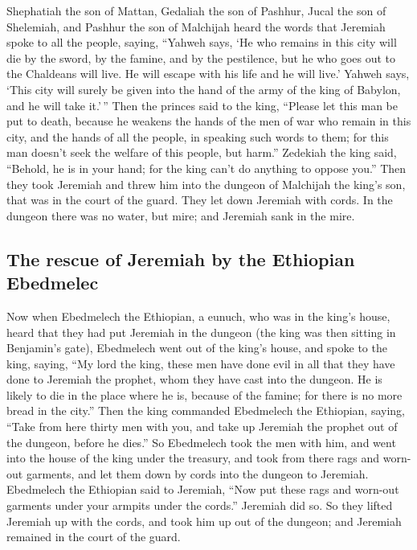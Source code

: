  Shephatiah the son of Mattan, Gedaliah the son of
Pashhur, Jucal the son of Shelemiah, and Pashhur the son of Malchijah
heard the words that Jeremiah spoke to all the people, saying,
 ``Yahweh says, `He who remains in this city will die by
the sword, by the famine, and by the pestilence, but he who goes out to
the Chaldeans will live. He will escape with his life and he will live.'
 Yahweh says, `This city will surely be given into the
hand of the army of the king of Babylon, and he will take it.'\,''
 Then the princes said to the king, ``Please let this man
be put to death, because he weakens the hands of the men of war who
remain in this city, and the hands of all the people, in speaking such
words to them; for this man doesn't seek the welfare of this people, but
harm.''  Zedekiah the king said, ``Behold, he is in your
hand; for the king can't do anything to oppose you.'' 
Then they took Jeremiah and threw him into the dungeon of Malchijah the
king's son, that was in the court of the guard. They let down Jeremiah
with cords. In the dungeon there was no water, but mire; and Jeremiah
sank in the mire.

\hypertarget{the-rescue-of-jeremiah-by-the-ethiopian-ebedmelec}{%
\subsection{The rescue of Jeremiah by the Ethiopian
Ebedmelec}\label{the-rescue-of-jeremiah-by-the-ethiopian-ebedmelec}}

 Now when Ebedmelech the Ethiopian, a eunuch, who was in
the king's house, heard that they had put Jeremiah in the dungeon (the
king was then sitting in Benjamin's gate),  Ebedmelech
went out of the king's house, and spoke to the king, saying,
 ``My lord the king, these men have done evil in all that
they have done to Jeremiah the prophet, whom they have cast into the
dungeon. He is likely to die in the place where he is, because of the
famine; for there is no more bread in the city.''  Then
the king commanded Ebedmelech the Ethiopian, saying, ``Take from here
thirty men with you, and take up Jeremiah the prophet out of the
dungeon, before he dies.''  So Ebedmelech took the men
with him, and went into the house of the king under the treasury, and
took from there rags and worn-out garments, and let them down by cords
into the dungeon to Jeremiah.  Ebedmelech the Ethiopian
said to Jeremiah, ``Now put these rags and worn-out garments under your
armpits under the cords.'' Jeremiah did so.  So they
lifted Jeremiah up with the cords, and took him up out of the dungeon;
and Jeremiah remained in the court of the guard.

